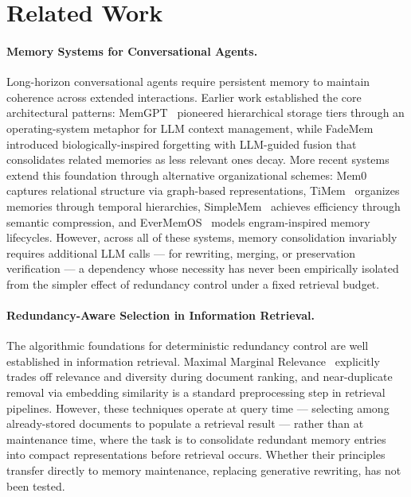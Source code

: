 \section{Related Work}
\label{sec:related}

\paragraph{Memory Systems for Conversational Agents.}
Long-horizon conversational agents require persistent memory to maintain coherence across extended interactions.
Earlier work established the core architectural patterns: MemGPT~\citep{Packer2023MemGPTTL} pioneered hierarchical storage tiers through an operating-system metaphor for LLM context management, while FadeMem~\citep{Wei2026FadeMemBF} introduced biologically-inspired forgetting with LLM-guided fusion that consolidates related memories as less relevant ones decay.
More recent systems extend this foundation through alternative organizational schemes: Mem0~\citep{chhikara2025mem0buildingproductionreadyai} captures relational structure via graph-based representations, TiMem~\citep{Li2026TiMemTM} organizes memories through temporal hierarchies, SimpleMem~\citep{Liu2026SimpleMemEL} achieves efficiency through semantic compression, and EverMemOS~\citep{Hu2026EverMemOSAS} models engram-inspired memory lifecycles.
However, across all of these systems, memory consolidation invariably requires additional LLM calls --- for rewriting, merging, or preservation verification --- a dependency whose necessity has never been empirically isolated from the simpler effect of redundancy control under a fixed retrieval budget.

\paragraph{Redundancy-Aware Selection in Information Retrieval.}
The algorithmic foundations for deterministic redundancy control are well established in information retrieval.
Maximal Marginal Relevance~\citep{Carbonell1998MMR} explicitly trades off relevance and diversity during document ranking, and near-duplicate removal via embedding similarity is a standard preprocessing step in retrieval pipelines.
However, these techniques operate at query time --- selecting among already-stored documents to populate a retrieval result --- rather than at maintenance time, where the task is to consolidate redundant memory entries into compact representations before retrieval occurs.
Whether their principles transfer directly to memory maintenance, replacing generative rewriting, has not been tested.

